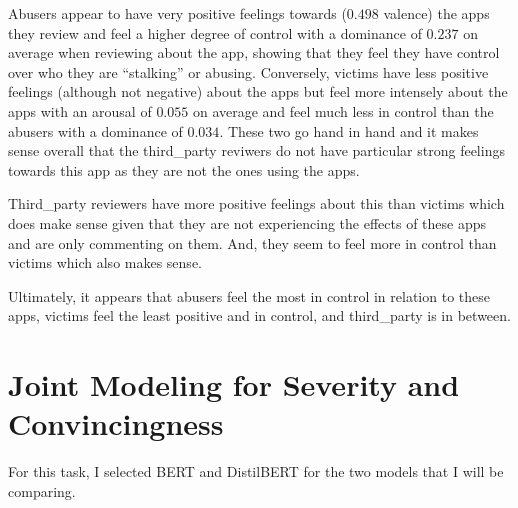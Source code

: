 \documentclass[12pt]{article}
\begin{document}
\begin{enumerate}
    Abusers appear to have very positive feelings towards ($0.498$ valence) the apps they review and feel a higher 
    degree of control with a dominance of $0.237$ on average when reviewing about the app, showing that they feel they 
    have control over who they are ``stalking'' or abusing. Conversely, victims have less positive feelings (although not negative) 
    about the apps but feel more intensely about the apps with an arousal of $0.055$ on average and feel much less in control than 
    the abusers with a dominance of $0.034$. These two go hand in hand and it makes sense overall that the third\_party reviwers do not have particular strong 
    feelings towards this app as they are not the ones using the apps. 

    Third\_party reviewers have more positive feelings about this than victims which does make sense given that 
    they are not experiencing the effects of these apps and are only commenting on them. And, they seem to feel 
    more in control than victims which also makes sense.

    Ultimately, it appears that abusers feel the most in control in relation to these apps, victims feel the 
    least positive and in control, and third\_party is in between.

\end{enumerate}

\section{Joint Modeling for Severity and Convincingness}

For this task, I selected BERT and DistilBERT for the two models that I will be comparing. 
\end{document}
